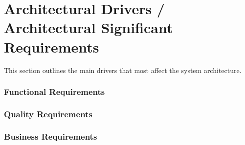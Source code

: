\chapter{Architectural Drivers / Architectural Significant Requirements}
	This section outlines the main drivers that most affect the system architecture.
	
	\subsection{Functional Requirements}
	
	\subsection{Quality Requirements}
	
	\subsection{Business Requirements}